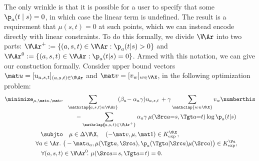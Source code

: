 %
The only wrinkle is that it is possible for a user to specify that some $\p_a(t\mid s) = 0$, in which case the linear term 
is undefined.
The result is a requirement that $\mu(s,t) = 0$ at such points,
which we can instead encode directly with linear constraints.
To do this formally,
we divide $\V\!\Ar$ into two parts:
$\V\!\Ar^+ := \{ (a,s,t) \in\V\!\Ar : \p_a(t |s) > 0\}$ and
$\V\!\Ar^0 := \{ (a,s,t) \in\V\!\Ar : \p_a(t |s) = 0\}$.
Armed with this notation, we can give our constuction formally.
Consider upper bound vectors
$\mat u = [ u_{a,s,t}]_{(a,s,t) \in \V\!\Ar}$ and $\mat v = [v_w]_{w \in \V\!\X}$,
in the following optimization problem:
%
\begin{align*}
\minimize_{\mu, \mat u, \mat v} & ~~
    \sum_{\mathrlap{\!\!\!(a,s,t) \in \V\!\Ar}}
        (\beta_a \!- \alpha_a \gamma) u_{a,s,t}
        \,+
        \gamma
        \sum_{\mathclap{w \in \V\!\X}} v_w
    \numberthis\label{prob:joint-small-gamma}
    \\[-0.2ex]
    &\qquad
    - \sum_{\mathrlap{\!\!\!(a,s,t) \in \smash{\V\!\Ar^+}}} 
        \alpha_a \gamma \, 
        \mu(\Src a{=}s,\Tgt a {=} t) \log \p_a (t|s)
\\[0.2ex]
\subjto&\quad \mu \in \Delta\V\!\X, 
        \quad ( -\mat v,  \mu,  \mat 1) \in K_{\exp}^{\V\!\X},
    \\[-0.4ex]
    \forall a \in \Ar.~
        &\big(-\mat u_a, \mu( \Tgt a,\Src a),\p_a(\Tgt a | \Src a)  \mu(\Src a) \big)
            \in K_{\exp}^{\V a}, \\[-0.1ex]
    \forall (a,s,t) &\in \V\!\Ar^0\!.~
    \mu(\Src a{=}\mskip2mus, \Tgt a{=}\mskip2mut) = 0.
\end{align*}

